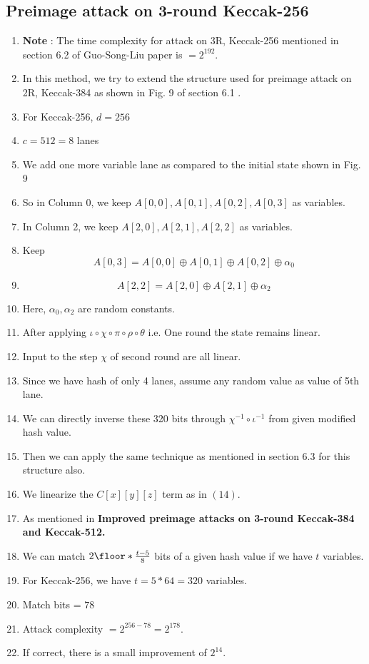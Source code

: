 \documentclass{article}
\begin{document}
\subsection{Preimage attack on 3-round Keccak-256}
\begin{enumerate}
    \item \textbf{Note} : The time complexity for attack on 3R, Keccak-256 mentioned in section 6.2 of Guo-Song-Liu paper is $ = 2^{192}$.
    \item In this method, we try to extend the structure used for preimage attack on 2R, Keccak-384 as shown in Fig. 9 of section 6.1 .
    \item For Keccak-256, $d = 256$
    \item $c = 512 = 8 $ lanes
    \item We add one more variable lane as compared to the initial state shown in Fig. 9
    \item So in Column 0, we keep $A[0,0], A[0,1], A[0,2], A[0,3]$ as variables.
    \item In Column 2, we keep $A[2,0], A[2,1], A[2,2]$ as variables.
    \item Keep \[
        A[0,3] = A[0,0] \oplus A[0,1] \oplus A[0, 2] \oplus \alpha_0
    \]
    \item \[
        A[2,2] = A[2,0] \oplus A[2,1] \oplus \alpha_2
    \]
    \item Here, $\alpha_0, \alpha_2$ are random constants.
    \item After applying $\iota \circ \chi \circ \pi \circ \rho \circ \theta $ i.e. One round the state remains linear.
    \item Input to the step $\chi$ of second round are all linear.
    \item Since we have hash of only 4 lanes, assume any random value as value of 5th lane.
    \item We can directly inverse these 320 bits through $\chi^{-1} \circ \iota^{-1}$ from given modified hash value.
    \item Then we can apply the same technique as mentioned in section 6.3 for this structure also.
    \item We linearize the $C[x][y][z]$ term as in $(14)$.
    \item As mentioned in \textbf{Improved preimage attacks on 3-round Keccak-384 and Keccak-512.}
    \item We can match $2\floor*{\frac{t - 5}{8}}$ bits of a given hash value if we have $t$ variables.
    \item For Keccak-256, we have $t = 5*64 = 320$ variables.
    \item Match bits = $78$
    \item Attack complexity $ = 2^{256 - 78} = 2^{178}$.
    \item If correct, there is a small improvement of $2^{14}$.
\end{enumerate}
\end{document}
